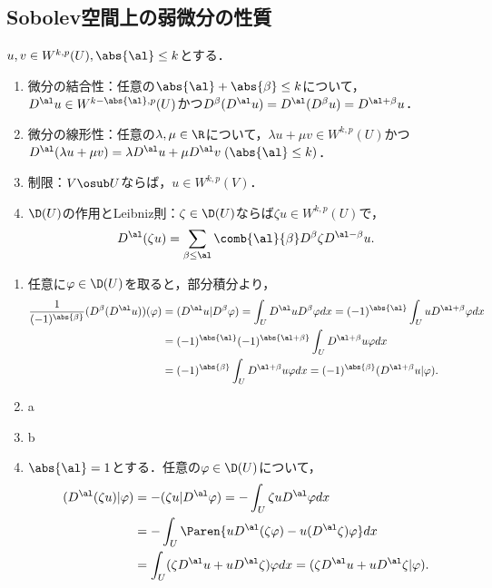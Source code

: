 \documentclass[uplatex,dvipdfmx]{jsreport}
\begin{document}
\subsection{Sobolev空間上の弱微分の性質}

\begin{theorem}
    $u,v\in W^{k,p}(U),\abs{\al}\le k$とする．
    \begin{enumerate}
        \item 微分の結合性：任意の$\abs{\al}+\abs{\beta}\le k$について，$D^\al u\in W^{k-\abs{\al},p}(U)$かつ$D^\beta(D^\al u)=D^\al(D^\beta u)=D^{\al+\beta}u$．
        \item 微分の線形性：任意の$\lambda,\mu\in\R$について，$\lambda u+\mu v\in W^{k,p}(U)$かつ$D^\al(\lambda u+\mu v)=\lambda D^\al u+\mu D^\al v\;(\abs{\al}\le k)$．
        \item 制限：$V\osub U$ならば，$u\in W^{k,p}(V)$．
        \item $\D(U)$の作用とLeibniz則：$\zeta\in\D(U)$ならば$\zeta u\in W^{k,p}(U)$で，
        \[D^\al(\zeta u)=\sum_{\beta\le\al}\comb{\al}{\beta}D^\beta\zeta D^{\al-\beta}u.\]
    \end{enumerate}
\end{theorem}
\begin{Proof}\mbox{}
    \begin{enumerate}
        \item 任意に$\varphi\in\D(U)$を取ると，部分積分より，
        \begin{align*}
            \frac{1}{(-1)^{\abs{\beta}}}(D^\beta(D^\al u))(\varphi)&=(D^\al u|D^\beta\varphi)=\int_UD^\al uD^\beta\varphi dx=(-1)^{\abs{\al}}\int_UuD^{\al+\beta}\varphi dx\\
            &=(-1)^{\abs{\al}}(-1)^{\abs{\al+\beta}}\int_UD^{\al+\beta}u\varphi dx\\
            &=(-1)^{\abs{\beta}}\int_UD^{\al+\beta}u\varphi dx=(-1)^{\abs{\beta}}(D^{\al+\beta}u|\varphi).
        \end{align*}
        \item a
        \item b
        \item $\abs{\al}=1$とする．任意の$\varphi\in\D(U)$について，
        \begin{align*}
            (D^\al(\zeta u)|\varphi)&=-(\zeta u|D^\al\varphi)=-\int_U\zeta uD^\al\varphi dx\\
            &=-\int_U\Paren{uD^\al(\zeta\varphi)-u(D^\al\zeta)\varphi}dx\\
            &=\int_U(\zeta D^\al u+uD^\al\zeta)\varphi dx=(\zeta D^\al u+uD^\al\zeta|\varphi).
        \end{align*}
    \end{enumerate}
\end{Proof}
\end{document}
